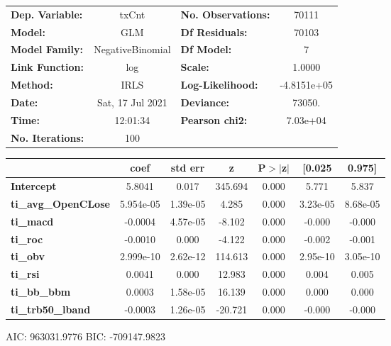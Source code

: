 \begin{center}
\begin{tabular}{lclc}
\toprule
\textbf{Dep. Variable:}     &      txCnt       & \textbf{  No. Observations:  } &     70111    \\
\textbf{Model:}             &       GLM        & \textbf{  Df Residuals:      } &     70103    \\
\textbf{Model Family:}      & NegativeBinomial & \textbf{  Df Model:          } &         7    \\
\textbf{Link Function:}     &       log        & \textbf{  Scale:             } &     1.0000   \\
\textbf{Method:}            &       IRLS       & \textbf{  Log-Likelihood:    } & -4.8151e+05  \\
\textbf{Date:}              & Sat, 17 Jul 2021 & \textbf{  Deviance:          } &     73050.   \\
\textbf{Time:}              &     12:01:34     & \textbf{  Pearson chi2:      } &   7.03e+04   \\
\textbf{No. Iterations:}    &       100        & \textbf{                     } &              \\
\bottomrule
\end{tabular}
\begin{tabular}{lcccccc}
                            & \textbf{coef} & \textbf{std err} & \textbf{z} & \textbf{P$> |$z$|$} & \textbf{[0.025} & \textbf{0.975]}  \\
\midrule
\textbf{Intercept}          &       5.8041  &        0.017     &   345.694  &         0.000        &        5.771    &        5.837     \\
\textbf{ti\_avg\_OpenCLose} &    5.954e-05  &     1.39e-05     &     4.285  &         0.000        &     3.23e-05    &     8.68e-05     \\
\textbf{ti\_macd}           &      -0.0004  &     4.57e-05     &    -8.102  &         0.000        &       -0.000    &       -0.000     \\
\textbf{ti\_roc}            &      -0.0010  &        0.000     &    -4.122  &         0.000        &       -0.002    &       -0.001     \\
\textbf{ti\_obv}            &    2.999e-10  &     2.62e-12     &   114.613  &         0.000        &     2.95e-10    &     3.05e-10     \\
\textbf{ti\_rsi}            &       0.0041  &        0.000     &    12.983  &         0.000        &        0.004    &        0.005     \\
\textbf{ti\_bb\_bbm}        &       0.0003  &     1.58e-05     &    16.139  &         0.000        &        0.000    &        0.000     \\
\textbf{ti\_trb50\_lband}   &      -0.0003  &     1.26e-05     &   -20.721  &         0.000        &       -0.000    &       -0.000     \\
\bottomrule
\end{tabular}
\end{center}

AIC: 963031.9776 BIC: -709147.9823

